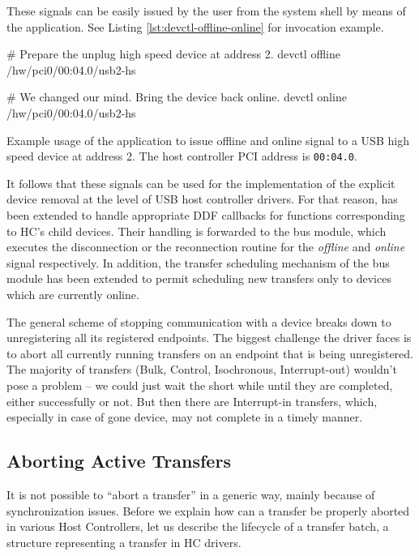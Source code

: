 These signals can be easily issued by the user from the system shell by means
of the  application. See Listing \ref{lst:devctl-offline-online}
for invocation example.

\begin{listing}
	\begin{bdsh}
		# Prepare the unplug high speed device at address 2.
		devctl offline /hw/pci0/00:04.0/usb2-hs

		# We changed our mind. Bring the device back online.
		devctl online /hw/pci0/00:04.0/usb2-hs
	\end{bdsh}
	\caption[Example usage of  to issue offline and online
	signal.]{Example usage of the  application to issue offline and
	online signal to a USB high speed device at address 2. The host controller
	PCI address is \texttt{00:04.0}.}
	\label{lst:devctl-offline-online}
\end{listing}

It follows that these signals can be used for the implementation of the
explicit device removal at the level of USB host controller drivers. For that
reason,  has been extended to handle appropriate DDF callbacks
for functions corresponding to HC's child devices. Their handling is forwarded
to the bus module, which executes the disconnection or the reconnection routine
for the \textit{offline} and \textit{online} signal respectively. In addition,
the transfer scheduling mechanism of the bus module has been extended to permit
scheduling new transfers only to devices which are currently online.

The general scheme of stopping communication with a device breaks down to
unregistering all its registered endpoints. The biggest challenge the driver
faces is to abort all currently running transfers on an endpoint that is being
unregistered. The majority of transfers (Bulk, Control, Isochronous,
Interrupt-out) wouldn't pose a problem -- we could just wait the short while
until they are completed, either successfully or not. But then there are
Interrupt-in transfers, which, especially in case of gone device, may not
complete in a timely manner.

\subsection{Aborting Active Transfers}
\label{sec:aborting-transfers}

It is not possible to ``abort a transfer'' in a generic way, mainly because of
synchronization issues. Before we explain how can a transfer be properly
aborted in various Host Controllers, let us describe the lifecycle of
a transfer batch, a structure representing a transfer in HC drivers.

